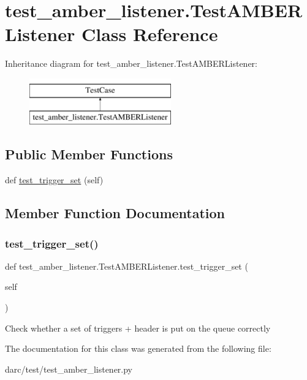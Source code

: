\hypertarget{classtest__amber__listener_1_1_test_a_m_b_e_r_listener}{}\section{test\+\_\+amber\+\_\+listener.\+Test\+A\+M\+B\+E\+R\+Listener Class Reference}
\label{classtest__amber__listener_1_1_test_a_m_b_e_r_listener}
Inheritance diagram for test\+\_\+amber\+\_\+listener.\+Test\+A\+M\+B\+E\+R\+Listener\+:\begin{figure}[H]
\begin{center}
\leavevmode
\includegraphics[height=2.000000cm]{classtest__amber__listener_1_1_test_a_m_b_e_r_listener}
\end{center}
\end{figure}
\subsection*{Public Member Functions}
\begin{DoxyCompactItemize}
\item 
def \mbox{\hyperlink{classtest__amber__listener_1_1_test_a_m_b_e_r_listener_a9ab674c21cc494d2ae87bd3137a07a68}{test\+\_\+trigger\+\_\+set}} (self)
\end{DoxyCompactItemize}


\subsection{Member Function Documentation}
\mbox{\label{classtest__amber__listener_1_1_test_a_m_b_e_r_listener_a9ab674c21cc494d2ae87bd3137a07a68}} 
\subsubsection{\texorpdfstring{test\_trigger\_set()}{test\_trigger\_set()}}
{\footnotesize\ttfamily def test\+\_\+amber\+\_\+listener.\+Test\+A\+M\+B\+E\+R\+Listener.\+test\+\_\+trigger\+\_\+set (\begin{DoxyParamCaption}\item[{}]{self }\end{DoxyParamCaption})}

\begin{DoxyVerb}Check whether a set of triggers + header is put on the queue correctly
\end{DoxyVerb}
 

The documentation for this class was generated from the following file\+:\begin{DoxyCompactItemize}
\item 
darc/test/test\+\_\+amber\+\_\+listener.\+py\end{DoxyCompactItemize}

